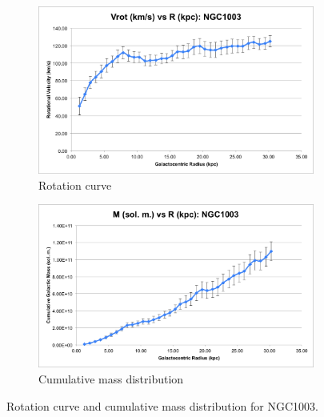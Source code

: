 \documentclass{article}
\begin{document}
\begin{figure}
    \centering
    \begin{subfigure}{0.4\textwidth}
        \includegraphics[width=\textwidth]{vrot/Vrot-3}
        \caption{Rotation curve}
    \end{subfigure}
    \hfill
    \begin{subfigure}{0.4\textwidth}
        \includegraphics[width=\textwidth]{m/M-3}
        \caption{Cumulative mass distribution}
    \end{subfigure}
    \caption{Rotation curve and cumulative mass distribution for NGC1003.}
    \label{fig:ngc1003}
\end{figure}
\end{document}
